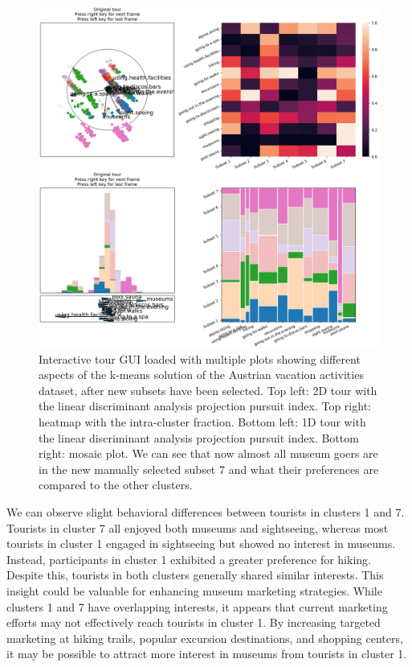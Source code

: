\documentclass[article]{ajs}
\begin{document}
\begin{figure}[h!]
    \centering
    \includegraphics[width=1\textwidth]{winter_cl7_post.png}
    \caption{Interactive tour GUI loaded with multiple plots showing different aspects of the k-means solution of the Austrian vacation activities dataset, after new subsets have been selected. Top left: 2D tour with the linear discriminant analysis projection pursuit index. Top right: heatmap with the intra-cluster fraction. Bottom left: 1D tour with the linear discriminant analysis projection pursuit index. Bottom right: mosaic plot. We can see that now almost all museum goers are in the new manually selected subset 7 and what their preferences are compared to the other clusters.}
    \label{fig:winter_cl7_post}
\end{figure}


We can observe slight behavioral differences between tourists in clusters 1 and 7. Tourists in cluster 7 all enjoyed both museums and sightseeing, whereas most tourists in cluster 1 engaged in sightseeing but showed no interest in museums. Instead, participants in cluster 1 exhibited a greater preference for hiking. Despite this, tourists in both clusters generally shared similar interests. This insight could be valuable for enhancing museum marketing strategies. While clusters 1 and 7 have overlapping interests, it appears that current marketing efforts may not effectively reach tourists in cluster 1. By increasing targeted marketing at hiking trails, popular excursion destinations, and shopping centers, it may be possible to attract more interest in museums from tourists in cluster 1.
\end{document}

